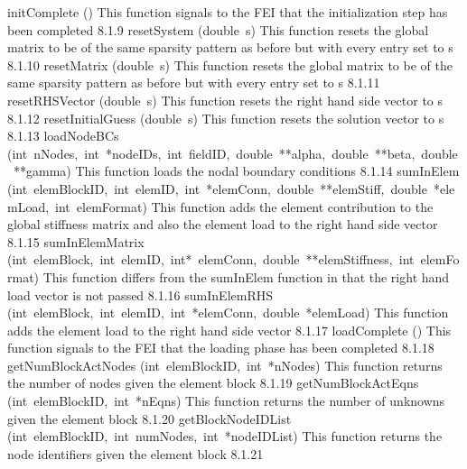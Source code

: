 \documentclass{article}
\begin{document}
\begin{cxxentry}
\begin{cxxentry}
\begin{cxxnames}
        {initComplete}
        {()}
        {
This function signals to the FEI that the initialization step has
been completed}
        {8.1.9}
        {resetSystem}
        {(double\ s)}
        {
This function resets the global matrix to be of the same sparsity
pattern as before but with every entry set to s}
        {8.1.10}
        {resetMatrix}
        {(double\ s)}
        {
This function resets the global matrix to be of the same sparsity
pattern as before but with every entry set to s}
        {8.1.11}
        {resetRHSVector}
        {(double\ s)}
        {
This function resets the right hand side vector to s}
        {8.1.12}
        {resetInitialGuess}
        {(double\ s)}
        {
This function resets the solution vector to s}
        {8.1.13}
        {loadNodeBCs}
        {(int\ nNodes,\ int\ *nodeIDs,\ int\ fieldID,\ double\ **alpha,\ double\ **beta,\ double\ **gamma)}
        {
This function loads the nodal boundary conditions}
        {8.1.14}
        {sumInElem}
        {(int\ elemBlockID,\ int\ elemID,\ int\ *elemConn,\ double\ **elemStiff,\ double\ *elemLoad,\ int\ elemFormat)}
        {
This function adds the element contribution to the global stiffness matrix
and also the element load to the right hand side vector
}
        {8.1.15}
        {sumInElemMatrix}
        {(int\ elemBlock,\ int\ elemID,\ int*\ elemConn,\ double\ **elemStiffness,\ int\ elemFormat)}
        {
This function differs from the sumInElem function in that the right hand
load vector is not passed}
        {8.1.16}
        {sumInElemRHS}
        {(int\ elemBlock,\ int\ elemID,\ int\ *elemConn,\ double\ *elemLoad)}
        {
This function adds the element load to the right hand side vector
}
        {8.1.17}
        {loadComplete}
        {()}
        {
This function signals to the FEI that the loading phase has
been completed}
        {8.1.18}
        {getNumBlockActNodes}
        {(int\ elemBlockID,\ int\ *nNodes)}
        {
This function returns the number of nodes given the element block}
        {8.1.19}
        {getNumBlockActEqns}
        {(int\ elemBlockID,\ int\ *nEqns)}
        {
This function returns the number of unknowns given the element block}
        {8.1.20}
        {getBlockNodeIDList}
        {(int\ elemBlockID,\ int\ numNodes,\ int\ *nodeIDList)}
        {
This function returns the node identifiers given the element block}
        {8.1.21}

\end{cxxnames}
\end{cxxentry}
\end{cxxentry}
\end{document}
